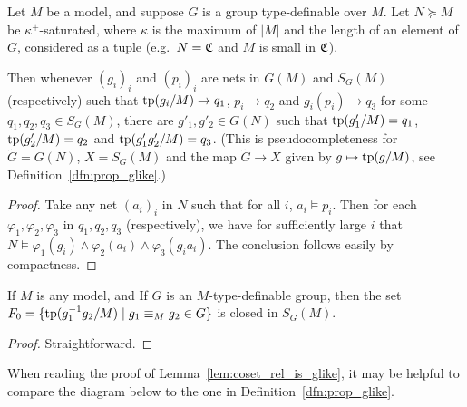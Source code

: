 	
	\begin{lem}
		\label{lem:pseudocompleteness_for_groups}
		Let $M$ be a model, and suppose $G$ is a group type-definable over $M$. Let $N\succeq M$ be $\kappa^+$-saturated, where $\kappa$ is the maximum of $\lvert M\rvert$ and the length of an element of $G$, considered as a tuple (e.g.\ $N={\mathfrak C}$ and $M$ is small in ${\mathfrak C}$).
		
		Then whenever $(g_i)_i$ and $(p_i)_i$ are nets in $G(M)$ and $S_G(M)$ (respectively) such that $\operatorname{{tp}}(g_i/M)\to q_1$, $p_i\to q_2$ and $g_i(p_i)\to q_3$ for some $q_1,q_2,q_3\in S_G(M)$, there are $g'_1,g'_2\in G(N)$ such that $\operatorname{{tp}}(g'_1/M)=q_1$, $\operatorname{{tp}}(g'_2/M)=q_2$ and $\operatorname{{tp}}(g'_1g'_2/M)=q_3$. (This is pseudocompleteness for $\tilde G=G(N)$, $X=S_G(M)$ and the map $\tilde G\to X$ given by $g\mapsto \operatorname{{tp}}(g/M)$, see Definition~\ref{dfn:prop_glike}.)
	\end{lem}
	\begin{proof}
		Take any net $(a_i)_i$ in $N$ such that for all $i$, $a_i\models p_i$. Then for each $\varphi_1,\varphi_2,\varphi_3$ in $q_1,q_2,q_3$ (respectively), we have for sufficiently large $i$ that $N\models \varphi_1(g_i)\land \varphi_2(a_i)\land \varphi_3(g_ia_i)$. The conclusion follows easily by compactness.
	\end{proof}
	
	\begin{lem}
		If $M$ is any model, and If $G$ is an $M$-type-definable group, then the set $F_0=\{\operatorname{{tp}}(g_1^{-1}g_2/M)\mid g_1\equiv_M g_2\in G \}$ is closed in $S_G(M)$.
	\end{lem}
	\begin{proof}
		Straightforward.
	\end{proof}
	
	When reading the proof of Lemma~\ref{lem:coset_rel_is_glike}, it may be helpful to compare the diagram below to the one in Definition~\ref{dfn:prop_glike}.
	
